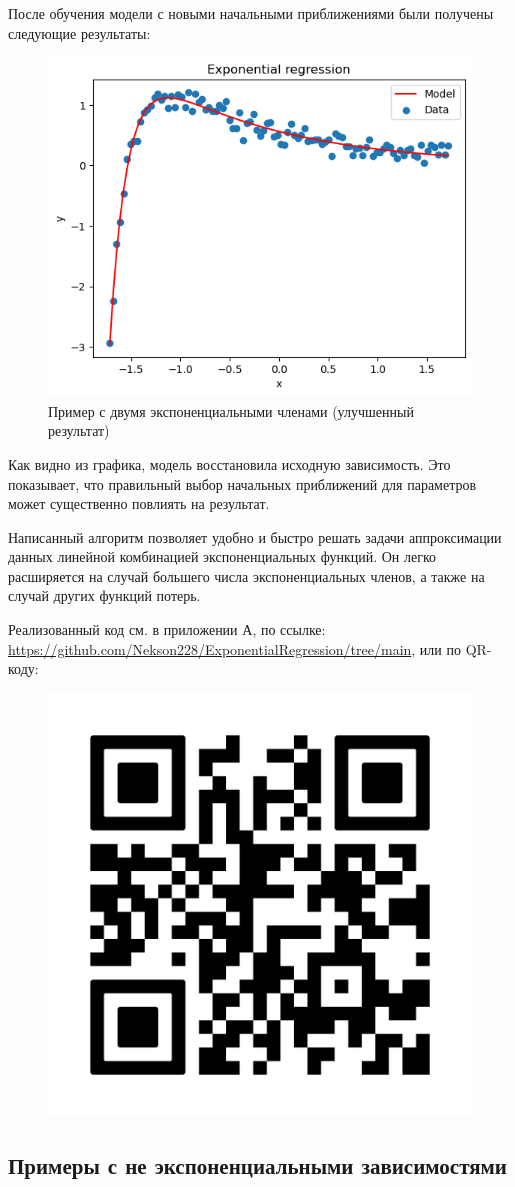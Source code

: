 После обучения модели с новыми начальными приближениями были получены следующие результаты:

\begin{figure}[h!]
	\centering
	\includegraphics[width=0.7\linewidth]{../img/ex2_good.png}
	\caption{Пример с двумя экспоненциальными членами (улучшенный результат)}
\end{figure}


Как видно из графика, модель восстановила исходную зависимость. Это показывает, что правильный выбор начальных приближений для параметров может существенно повлиять на результат.

Написанный алгоритм позволяет удобно и быстро решать задачи аппроксимации данных линейной комбинацией экспоненциальных функций. Он легко расширяется на случай большего числа экспоненциальных членов, а также на случай других функций потерь.

Реализованный код см. в приложении А, по ссылке: \url{https://github.com/Nekson228/ExponentialRegression/tree/main}, или по QR-коду:

\begin{figure}[h!]
	\centering
	\includegraphics[width=0.2\linewidth]{../img/qr.png}
\end{figure}

\subsection{Примеры с не экспоненциальными зависимостями}

